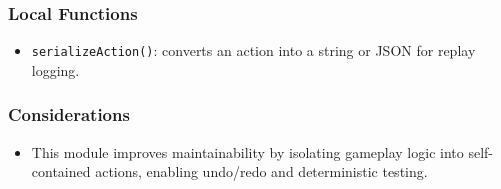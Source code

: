 \documentclass[12pt, titlepage]{article}
\begin{document}
\subsubsection{Local Functions}
\begin{itemize}
    \item \texttt{serializeAction()}: converts an action into a string or JSON for replay logging.
\end{itemize}

\subsubsection{Considerations}
\begin{itemize}
    \item This module improves maintainability by isolating gameplay logic into self-contained actions, enabling undo/redo and deterministic testing.
\end{itemize}
\end{document}
